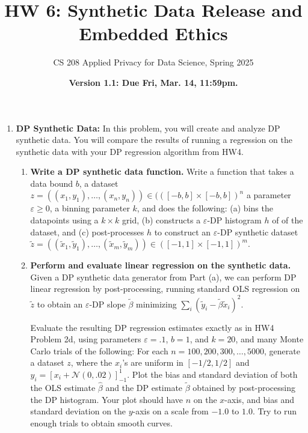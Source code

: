 \documentclass[11pt]{article}
\title{\vspace{-1.5cm} HW 6: Synthetic Data Release and Embedded Ethics}
\author{CS 208 Applied Privacy for Data Science, Spring 2025}
\date{\textbf{Version 1.1: Due Fri, Mar. 14, 11:59pm.}}
\begin{document}
\maketitle

\instructions

\begin{enumerate}[leftmargin=*] 

\item \textbf{DP Synthetic Data:}
        In this problem, you will create and analyze DP synthetic data.
        You will compare the results of running a regression on the synthetic data with your DP regression algorithm from HW4.

        \begin{enumerate}
            \item \textbf{Write a DP synthetic data function.}
            Write a function that takes a data bound $b$, a dataset $z=((x_1,y_1),\ldots,(x_n,y_n))\in (([-b,b]\times [-b,b])^n$
            a parameter $\varepsilon\geq 0$, a binning parameter $k$, and
            does the following:
            (a) bins the datapoints using a $k\times k$ grid, (b) constructs a $\varepsilon$-DP histogram $h$ of of the dataset, and (c) post-processes $h$ to construct an $\varepsilon$-DP synthetic dataset $\tilde{z} = ((\tilde{x}_1,\tilde{y}_1),\ldots,(\tilde{x}_m,\tilde{y}_m))
            \in ([-1,1]\times [-1,1])^m$.  
            \label{part:histogram}
            \item \textbf{Perform and evaluate linear regression on the synthetic data.} 
            Given a
            DP synthetic data generator from Part (a), we can
            perform DP linear regression by post-processing, running
            standard OLS regression on $\tilde{z}$ to 
            obtain an $\varepsilon$-DP slope $\tilde{\beta}$ minimizing 
            $\sum_i (\tilde{y}_i-\tilde{\beta}\tilde{x}_i)^2$.

        Evaluate the resulting DP regression estimates exactly as in HW4                Problem 2d, using parameters $\varepsilon=.1$, $b=1$, and $k=20$, and              many Monte Carlo trials of the following:
           For each $n=100,200,300,\ldots,5000$, 
            generate a dataset $z$, where the 
            $x_i$'s are uniform in $[-1/2,1/2]$ and 
            $y_i = \left[x_i + \mathcal{N}(0,.02)\right]_{-1}^{1}.$
            Plot the bias and standard deviation of both the OLS estimate $\hat{\beta}$ and the DP estimate $\tilde{\beta}$ obtained by
            post-processing the DP histogram.  
            Your plot should have $n$ on the $x$-axis, and bias and standard deviation on the $y$-axis on a scale from $-1.0$ to $1.0$.
            Try to run enough trials to obtain smooth curves.


\end{enumerate}
\end{enumerate}
\end{document}

